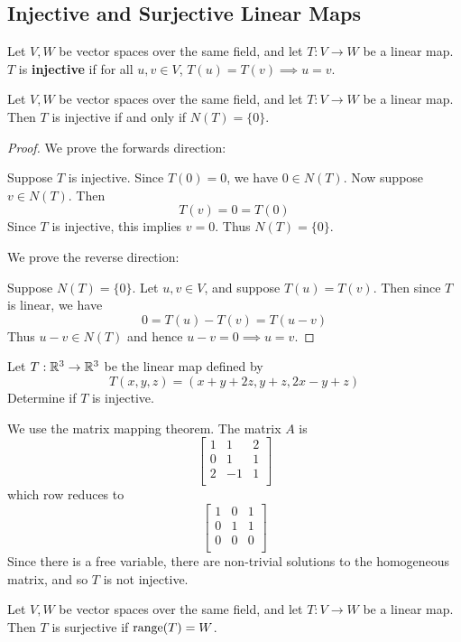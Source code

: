 \documentclass{article}
\begin{document}
\subsection{Injective and Surjective Linear Maps}
\begin{definition}
  Let $V, W$ be vector spaces over the same field, and let $T: V \to W$ be a linear map. $T$ is \textbf{injective} if for all $u, v \in V$, $T(u) = T(v) \implies u = v$.
\end{definition}
\begin{theorem}
  Let $V, W$ be vector spaces over the same field, and let $T: V \to W$ be a linear map. Then $T$ is injective if and only if $N(T) = \{0\}$.
\end{theorem}
\begin{proof}
  We prove the forwards direction:

  Suppose $T$ is injective. Since $T(0) = 0$, we have $0 \in N(T)$. Now suppose $v \in N(T)$. Then \[
    T(v) = 0 = T(0)
  \]
  Since $T$ is injective, this implies $v = 0$. Thus $N(T) = \{0\}$.

  We prove the reverse direction:

  Suppose $N(T) = \{0\}$. Let $u, v \in V$, and suppose $T(u) = T(v)$. Then since $T$ is linear, we have \[
    0 = T(u) - T(v) = T(u-v)
  \]
  Thus $u-v \in N(T)$ and hence $u-v = 0 \implies u = v$.
\end{proof}
\begin{example}
  Let $T: \mathbb{R}^3 \to \mathbb{R}^3$ be the linear map defined by \[
    T(x, y, z) = (x + y + 2z, y + z, 2x - y + z)
  \]
  Determine if $T$ is injective.

  We use the matrix mapping theorem. The matrix $A$ is \[
    \begin{bmatrix}
      1 & 1 & 2\\
      0 & 1 & 1\\
      2 & -1 & 1\\
    \end{bmatrix}
  \] which row reduces to \[
    \begin{bmatrix}
      1 & 0 & 1\\
      0 & 1 & 1\\
      0 & 0 & 0\\
    \end{bmatrix}
  \]
  Since there is a free variable, there are non-trivial solutions to the homogeneous matrix, and so $T$ is not injective.
\end{example}
\begin{definition}
  Let $V, W$ be vector spaces over the same field, and let $T: V \to W$ be a linear map. Then $T$ is surjective if $\operatorname{\text{range}}(T) = W$.
\end{definition}
\end{document}
